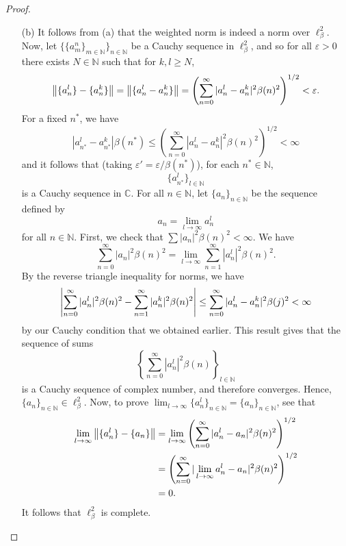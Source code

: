 \documentclass[12pt]{article}
\theoremstyle{definition}
\begin{document}
\begin{proof}
\begin{itemize}
			\item[(b)] It follows from (a) that the weighted norm is indeed a norm over $\ell_\beta^2$. Now, let $\{\{a_m^n\}_{m \in \mathbb{N}}\}_{n \in \mathbb{N}}$ be a Cauchy sequence in $\ell_\beta^2$, and so for all $\varepsilon > 0$ there exists $N \in \mathbb{N}$ such that for $k, l \geq N$, $$\norm{\{a_n^l\} - \{a_n^k\}} = \norm{\{a_n^l - a_n^k\}} = \left(\sum_{n = 0}^\infty |a_n^l - a_n^k|^2 \beta(n)^2\right)^{1/2} < \varepsilon.$$ For a fixed $n^\ast$, we have $$|a_{n^\ast}^l - a_{n^\ast}^k|\beta(n^\ast) \leq \left(\sum_{n = 0}^\infty |a_n^l - a_n^k|^2 \beta(n)^2\right)^{1/2} < \infty$$ and it follows that (taking $\varepsilon' = \varepsilon/\beta(n^\ast)$), for each $n^\ast \in \mathbb{N}$, $$\{a_{n^\ast}^l\}_{l \in \mathbb{N}}$$ is a Cauchy sequence in $\mathbb{C}$. For all $n \in \mathbb{N}$, let $\{a_n\}_{n \in \mathbb{N}}$ be the sequence defined by $$a_n = \lim_{l \to \infty} a_n^l$$ for all $n \in \mathbb{N}$. First, we check that $\sum |a_n|^2 \beta(n)^2 < \infty$. We have $$\sum_{n = 0}^\infty |a_n|^2 \beta(n)^2 = \lim_{l \to \infty} \sum_{n = 1}^\infty |a_n^l|^2 \beta(n)^2.$$ By the reverse triangle inequality for norms, we have $$\abs{\sum_{n = 0}^\infty |a_n^l|^2\beta(n)^2 - \sum_{n = 1}^\infty |a_n^k|^2\beta(n)^2} \leq \sum_{n = 0}^\infty |a_n^l - a_n^k|^2 \beta(j)^2 < \infty$$ by our Cauchy condition that we obtained earlier. This result gives that the sequence of sums $$\left\{\sum_{n  = 0}^\infty |a_n^l|^2 \beta(n)\right\}_{l \in \mathbb{N}}$$ is a Cauchy sequence of complex number, and therefore converges. Hence, $\{a_n\}_{n \in \mathbb{N}} \in \ell_\beta^2$. Now, to prove $\lim_{l \to \infty} \{a_n^l\}_{n \in \mathbb{N}} = \{a_n\}_{n \in \mathbb{N}}$, see that
				\begin{align*}
					\lim_{l \to \infty} \norm{\{a_n^l\} - \{a_n\}} &= \lim_{l \to \infty}\left(\sum_{n = 0}^\infty|a_n^l - a_n|^2 \beta(n)^2\right)^{1/2} \\
					&= \left(\sum_{n = 0}^\infty |\lim_{l \to \infty}a_n^l - a_n|^2 \beta(n)^2\right)^{1/2} \\
					&= 0. 
				\end{align*} 
			It follows that $\ell_\beta^2$ is complete. 
		\end{itemize}
	\end{proof}
	
\end{document}
